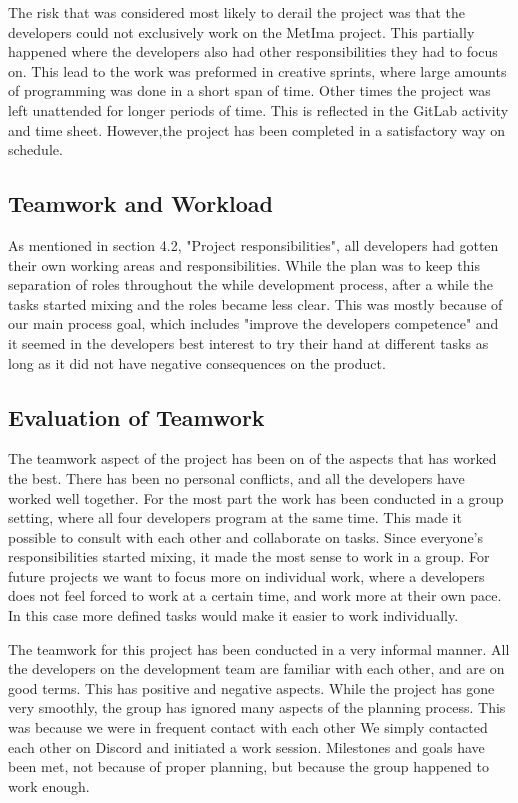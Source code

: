             The risk that was considered most likely to derail the project was that the developers could not exclusively work on the MetIma project. This partially happened where the developers also had other responsibilities they had to focus on. This lead to the work was preformed in creative sprints, where large amounts of programming was done in a short span of time. Other times the project was left unattended for longer periods of time. This is reflected in the GitLab activity and time sheet. However,the project has been completed in a satisfactory way on schedule. 
            
            \subsection{Teamwork and Workload} 
            As mentioned in section 4.2, "Project responsibilities", all developers had gotten their own working areas and responsibilities. While the plan was to keep this separation of roles throughout the while development process, after a while the tasks started mixing and the roles became less clear. This was mostly because of our main process goal, which includes "improve the developers competence" and it seemed in the developers best interest to try their hand at different tasks as long as it did not have negative consequences on the product. 
        
        \subsection{Evaluation of Teamwork}
            The teamwork aspect of the project has been on of the aspects that has worked the best. There has been no personal conflicts, and all the developers have worked well together. For the most part the work has been conducted in a group setting, where all four developers program at the same time. This made it possible to consult with each other and collaborate on tasks. Since everyone's responsibilities started mixing, it made the most sense to work in a group. For future projects we want to focus more on individual work, where a developers does not feel forced to work at a certain time, and work more at their own pace. In this case more defined tasks would make it easier to work individually.
        
            The teamwork for this project has been conducted in a very informal manner. All the developers on the development team are familiar with each other, and are on good terms. This has positive and negative aspects. While the project has gone very smoothly, the group has ignored many aspects of the planning process. This was because we were in frequent contact with each other  We simply contacted each other on Discord and initiated a work session. Milestones and goals have been met, not because of proper planning, but because the group happened to work enough. 
            
